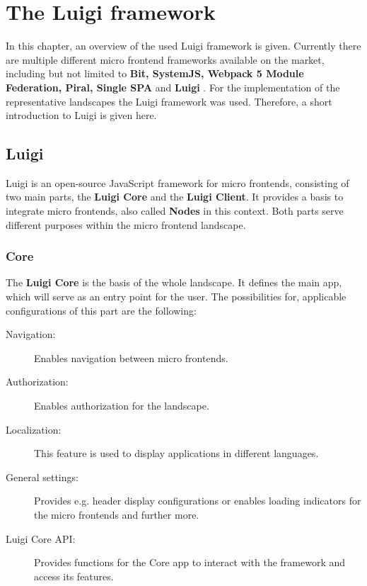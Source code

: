 \chapter{The Luigi framework} %
\label{Chapter2}


In this chapter, an overview of the used Luigi framework is given. Currently there are multiple different micro frontend frameworks available on the market, including but not limited to \textbf{Bit, SystemJS, Webpack 5 Module Federation, Piral, Single SPA} and \textbf{Luigi} \cite{top10_mffs}.
For the implementation of the representative landscapes the Luigi framework was used. Therefore, a short introduction to Luigi is given here.

\section{Luigi}

Luigi is an open-source JavaScript framework for micro frontends, consisting of two main parts, the \textbf{Luigi Core} and the \textbf{Luigi Client}. It provides a basis to integrate micro frontends, also called \textbf{Nodes} in this context. Both parts serve different purposes within the micro frontend landscape.\cite{luigi_doc_overview}

\subsection{Core}

The \textbf{Luigi Core} is the basis of the whole landscape. It defines the main app, which will serve as an entry point for the user. The possibilities for, applicable configurations of this part are the following:

\begin{description}
	\item[Navigation:] Enables navigation between micro frontends.
	\item[Authorization:] Enables authorization for the landscape.
	\item[Localization:] This feature is used to display applications in different languages.
	\item[General settings:] Provides e.g. header display configurations or enables loading indicators for the micro frontends and further more.
	\item[Luigi Core API:] Provides functions for the Core app to interact with the framework and access its features.
\end{description}

